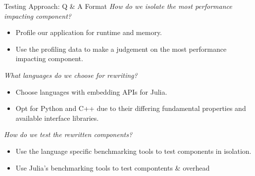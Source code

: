 \begin{frame}{Testing Approach: Q \& A Format}
        \textit{How do we isolate the most performance impacting component?} 
        \begin{itemize}
            \item Profile our application for runtime and memory.
            \item Use the profiling data to make a judgement on the most performance impacting component.
        \end{itemize}
        \pause
        \textit{What languages do we choose for rewriting?}
        \begin{itemize}
            \item Choose languages with embedding APIs for Julia. 
            \item Opt for Python and C++ due to their differing fundamental properties and available interface libraries.
        \end{itemize}
        \pause
        \textit{How do we test the rewritten components?}
        \begin{itemize}
            \item Use the language specific benchmarking tools to test components in isolation.
            \item Use Julia's benchmarking tools to test compontents \& overhead 
        \end{itemize}
\end{frame}